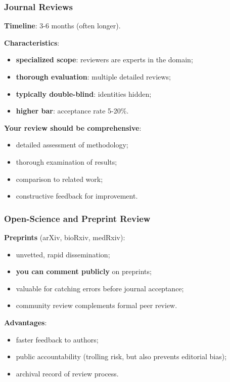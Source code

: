 \documentclass[]{beamer}
\begin{document}
\begin{frame}[fragile]
\frametitle{Journal Reviews}
\textbf{Timeline}: 3-6 months (often longer).

\textbf{Characteristics}:
\begin{itemize}
  \item \textbf{specialized scope}: reviewers are experts in the domain;
  \item \textbf{thorough evaluation}: multiple detailed reviews;
  \item \textbf{typically double-blind}: identities hidden;
  \item \textbf{higher bar}: acceptance rate 5-20\%.
\end{itemize}

\textbf{Your review should be comprehensive}:
\begin{itemize}
  \item detailed assessment of methodology;
  \item thorough examination of results;
  \item comparison to related work;
  \item constructive feedback for improvement.
\end{itemize}

\end{frame}

\begin{frame}[fragile]
\frametitle{Open-Science and Preprint Review}
\textbf{Preprints} (arXiv, bioRxiv, medRxiv):
\begin{itemize}
  \item unvetted, rapid dissemination;
  \item \textbf{you can comment publicly} on preprints;
  \item valuable for catching errors before journal acceptance;
  \item community review complements formal peer review.
\end{itemize}

\textbf{Advantages}:
\begin{itemize}
  \item faster feedback to authors;
  \item public accountability (trolling risk, but also prevents editorial bias);
  \item archival record of review process.
\end{itemize}

\end{frame}
\end{document}
